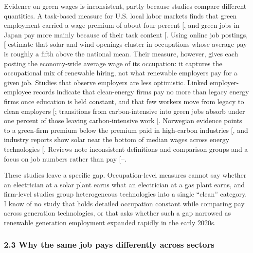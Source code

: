 \documentclass[
  11pt,
]{article}
\begin{document}
Evidence on green wages is inconsistent, partly because studies compare
different quantities. A task-based measure for U.S. local labor markets
finds that green employment carried a wage premium of about four percent
{[}\citeproc{ref-vona2019measures}{3}{]}, and green jobs in Japan pay
more mainly because of their task content
{[}\citeproc{ref-kuai2025estimating}{20}{]}. Using online job postings,
{[}\citeproc{ref-curtis2023green}{4}{]} estimate that solar and wind
openings cluster in occupations whose average pay is roughly a fifth
above the national mean. Their measure, however, gives each posting the
economy-wide average wage of its occupation: it captures the
occupational mix of renewable hiring, not what renewable employers pay
for a given job. Studies that observe employers are less optimistic.
Linked employer-employee records indicate that clean-energy firms pay no
more than legacy energy firms once education is held constant, and that
few workers move from legacy to clean employers
{[}\citeproc{ref-colmer2025nice}{5}{]}; transitions from
carbon-intensive into green jobs absorb under one percent of those
leaving carbon-intensive work
{[}\citeproc{ref-curtis2024workers}{21}{]}. Norwegian evidence points to
a green-firm premium below the premium paid in high-carbon industries
{[}\citeproc{ref-godoy2025green}{22}{]}, and industry reports show solar
near the bottom of median wages across energy technologies
{[}\citeproc{ref-lehmann2020wages}{23}{]}. Reviews note inconsistent
definitions and comparison groups and a focus on job numbers rather than
pay
{[}--\citeproc{ref-pearse2022labour}{26}{]}.

These studies leave a specific gap. Occupation-level measures cannot say
whether an electrician at a solar plant earns what an electrician at a
gas plant earns, and firm-level studies group heterogeneous technologies
into a single ``clean'' category. I know of no study that holds detailed
occupation constant while comparing pay across generation technologies,
or that asks whether such a gap narrowed as renewable generation
employment expanded rapidly in the early 2020s.

\subsubsection{2.3 Why the same job pays differently across
sectors}\label{why-the-same-job-pays-differently-across-sectors}
\end{document}

